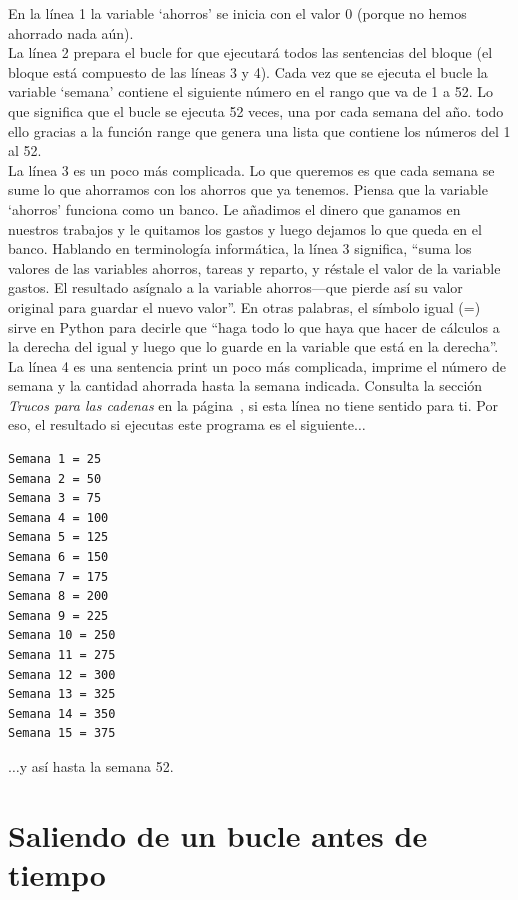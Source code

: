 En la línea 1 la variable `ahorros' se inicia con el valor 0 (porque no hemos ahorrado nada aún).\\
La línea 2 prepara el bucle for que ejecutará todos las sentencias del bloque (el bloque está compuesto de las líneas 3 y 4).  Cada vez que se ejecuta el bucle la variable `semana' contiene el siguiente número en el rango que va de 1 a 52. Lo que significa que el bucle se ejecuta 52 veces, una por cada semana del año. todo ello gracias a la función range que genera una lista que contiene los números del 1 al 52.\\
La línea 3 es un poco más complicada.  Lo que queremos es que cada semana se sume lo que ahorramos con los ahorros que ya tenemos.   Piensa que la variable `ahorros' funciona como un banco.  Le añadimos el dinero que ganamos en nuestros trabajos y le quitamos los gastos y luego dejamos lo que queda en el banco.  Hablando en terminología informática, la línea 3 significa, ``suma los valores de las variables ahorros, tareas y  reparto, y réstale el valor de la variable gastos. El resultado asígnalo a la variable ahorros---que pierde así su valor original para guardar el nuevo valor''. En otras palabras, el símbolo igual (=) sirve en Python para decirle que ``haga todo lo que haya que hacer de cálculos a la derecha del igual y luego que lo guarde en la variable que está en la derecha''.\\ 
La línea 4 es una sentencia print un poco más complicada, imprime el número de semana y la cantidad ahorrada hasta la semana indicada.  Consulta la sección \emph{Trucos para las cadenas} en la página~\pageref{trickswithstrings}, si esta línea no tiene sentido para ti.  Por eso, el resultado si ejecutas este programa es el siguiente$\ldots$

\begin{listing}
\begin{verbatim}
Semana 1 = 25
Semana 2 = 50
Semana 3 = 75
Semana 4 = 100
Semana 5 = 125
Semana 6 = 150
Semana 7 = 175
Semana 8 = 200
Semana 9 = 225
Semana 10 = 250
Semana 11 = 275
Semana 12 = 300
Semana 13 = 325
Semana 14 = 350
Semana 15 = 375
\end{verbatim}
\end{listing}

$\ldots$y así hasta la semana 52.

\section{Saliendo de un bucle antes de tiempo}

